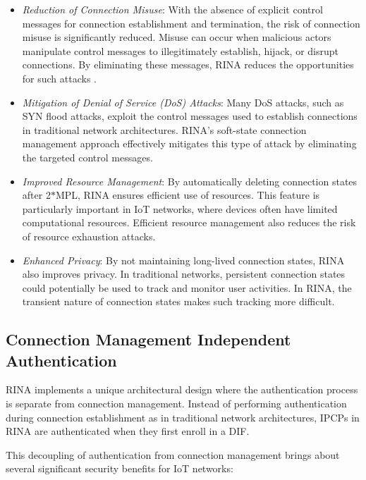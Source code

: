 \documentclass{ieeeaccess}
\begin{document}
\begin{itemize}
	\item \textit{Reduction of Connection Misuse}: With the absence of explicit control messages for connection establishment and termination, the risk of connection misuse is significantly reduced. Misuse can occur when malicious actors manipulate control messages to illegitimately establish, hijack, or disrupt connections. By eliminating these messages, RINA reduces the opportunities for such attacks \cite{boddapati2012assessing}.
	\item \textit{Mitigation of Denial of Service (DoS) Attacks}: Many DoS attacks, such as SYN flood attacks, exploit the control messages used to establish connections in traditional network architectures. RINA's soft-state connection management approach effectively mitigates this type of attack by eliminating the targeted control messages.
	\item \textit{Improved Resource Management}: By automatically deleting connection states after 2$*$MPL, RINA ensures efficient use of resources. This feature is particularly important in IoT networks, where devices often have limited computational resources. Efficient resource management also reduces the risk of resource exhaustion attacks.
	\item \textit{Enhanced Privacy}: By not maintaining long-lived connection states, RINA also improves privacy. In traditional networks, persistent connection states could potentially be used to track and monitor user activities. In RINA, the transient nature of connection states makes such tracking more difficult.
\end{itemize}

\subsection{Connection Management Independent Authentication}

RINA implements a unique architectural design where the authentication process is separate from connection management. Instead of performing authentication during connection establishment as in traditional network architectures, IPCPs in RINA are authenticated when they first enroll in a DIF.

This decoupling of authentication from connection management brings about several significant security benefits for IoT networks:
\end{document}
